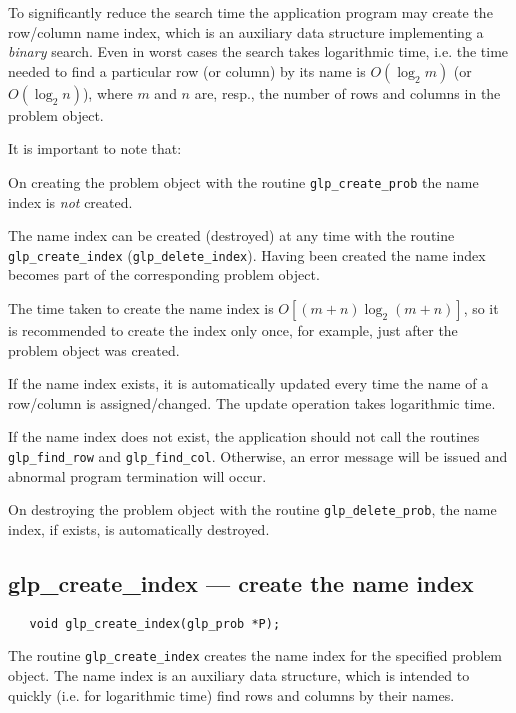To significantly reduce the search time the application program may
create the row/column name index, which is an auxiliary data structure
implementing a {\it binary} search. Even in worst cases the search
takes logarithmic time, i.e. the time needed to find a particular row
(or column) by its name is $O(\log_2m)$ (or $O(\log_2n)$), where $m$
and $n$ are, resp., the number of rows and columns in the problem
object.

It is important to note that:

On creating the problem object with the routine
\verb|glp_create_prob| the name index is {\it not} created.

The name index can be created (destroyed) at any time with the
routine \verb|glp_create_index| (\verb|glp_delete_index|). Having been
created the name index becomes part of the corresponding problem
object.

The time taken to create the name index is
$O[(m+n)\log_2(m+n)]$, so it is recommended to create the index only
once, for example, just after the problem object was created.

If the name index exists, it is automatically updated every
time the name of a row/column is assigned/changed. The update operation
takes logarithmic time.

If the name index does not exist, the application should not
call the routines \verb|glp_find_row| and \verb|glp_find_col|.
Otherwise, an error message will be issued and abnormal program
termination will occur.

On destroying the problem object with the routine
\verb|glp_delete_prob|, the name index, if exists, is automatically
destroyed.

\subsection{glp\_create\_index --- create the name index}

\synopsis

\begin{verbatim}
   void glp_create_index(glp_prob *P);
\end{verbatim}

\description

The routine \verb|glp_create_index| creates the name index for the
specified problem object. The name index is an auxiliary data
structure, which is intended to quickly (i.e. for logarithmic time)
find rows and columns by their names.

